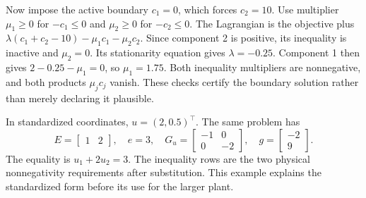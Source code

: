 Now impose the active boundary $c_1=0$, which forces $c_2=10$. Use multiplier $\mu_1\ge0$ for $-c_1\le0$ and $\mu_2\ge0$ for $-c_2\le0$. The Lagrangian is the objective plus $\lambda(c_1+c_2-10)-\mu_1c_1-\mu_2c_2$. Since component 2 is positive, its inequality is inactive and $\mu_2=0$. Its stationarity equation gives $\lambda=-0.25$. Component 1 then gives $2-0.25-\mu_1=0$, so $\mu_1=1.75$. Both inequality multipliers are nonnegative, and both products $\mu_jc_j$ vanish. These checks certify the boundary solution rather than merely declaring it plausible.

In standardized coordinates, $u=(2,0.5)^\top$. The same problem has
\begin{equation}
E=\begin{bmatrix}1&2\end{bmatrix},\quad e=3,\quad
G_u=\begin{bmatrix}-1&0\\0&-2\end{bmatrix},\quad
g=\begin{bmatrix}-2\\9\end{bmatrix}.
\end{equation}
The equality is $u_1+2u_2=3$. The inequality rows are the two physical nonnegativity requirements after substitution. This example explains the standardized form before its use for the larger plant.

